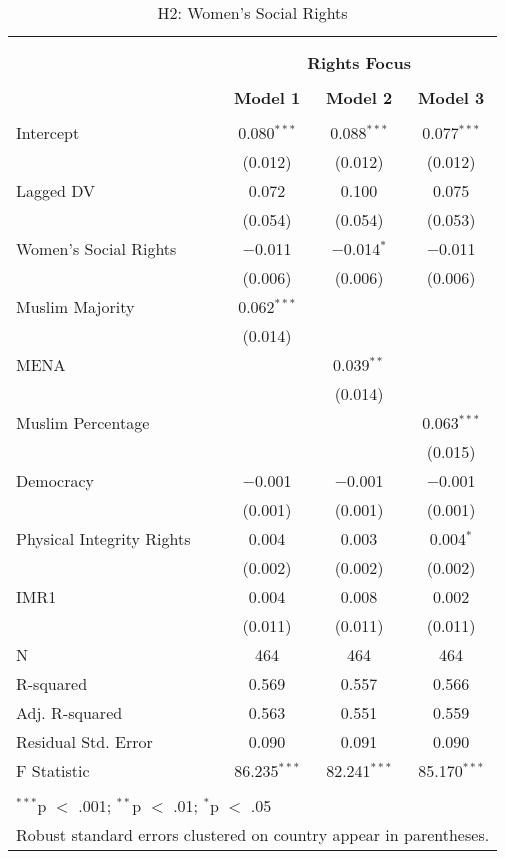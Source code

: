 
\begin{table}[!htbp] \centering 
  \caption{H2: Women's Social Rights} 
  \label{} 
\begin{tabular}{@{\extracolsep{5pt}}lccc} 
\\[-1.8ex]\hline \\[-1.8ex] 
\\[-1.8ex] & \multicolumn{3}{c}{\textbf{Rights Focus}} \\ 
\\[-1.8ex] & \textbf{Model 1} & \textbf{Model 2} & \textbf{Model 3}\\ 
\hline \\[-1.8ex] 
 Intercept & 0.080$^{***}$ & 0.088$^{***}$ & 0.077$^{***}$ \\ 
  & (0.012) & (0.012) & (0.012) \\ 
  Lagged DV & 0.072 & 0.100 & 0.075 \\ 
  & (0.054) & (0.054) & (0.053) \\ 
  Women's Social Rights & $-$0.011 & $-$0.014$^{*}$ & $-$0.011 \\ 
  & (0.006) & (0.006) & (0.006) \\ 
  Muslim Majority & 0.062$^{***}$ &  &  \\ 
  & (0.014) &  &  \\ 
  MENA &  & 0.039$^{**}$ &  \\ 
  &  & (0.014) &  \\ 
  Muslim Percentage &  &  & 0.063$^{***}$ \\ 
  &  &  & (0.015) \\ 
  Democracy & $-$0.001 & $-$0.001 & $-$0.001 \\ 
  & (0.001) & (0.001) & (0.001) \\ 
  Physical Integrity Rights & 0.004 & 0.003 & 0.004$^{*}$ \\ 
  & (0.002) & (0.002) & (0.002) \\ 
  IMR1 & 0.004 & 0.008 & 0.002 \\ 
  & (0.011) & (0.011) & (0.011) \\ 
 N & 464 & 464 & 464 \\ 
R-squared & 0.569 & 0.557 & 0.566 \\ 
Adj. R-squared & 0.563 & 0.551 & 0.559 \\ 
Residual Std. Error & 0.090 & 0.091 & 0.090 \\ 
F Statistic & 86.235$^{***}$ & 82.241$^{***}$ & 85.170$^{***}$ \\ 
\hline \\[-1.8ex] 
\multicolumn{4}{l}{$^{***}$p $<$ .001; $^{**}$p $<$ .01; $^{*}$p $<$ .05} \\ 
\multicolumn{4}{l}{Robust standard errors clustered on country appear in parentheses.} \\ 
\end{tabular} 
\end{table} 

